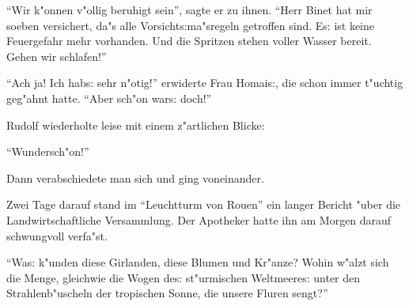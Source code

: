 \documentclass[oneside,12pt]{book}
\newcommand{\s}{s:}%
\begin{document}
"`Wir k"onnen v"ollig beruhigt sein"', sagte er zu ihnen. "`Herr
Binet hat mir soeben versichert, da"s alle Vorsicht{\s}ma"sregeln
getroffen sind. E{\s} ist keine Feuergefahr mehr vorhanden. Und
die Spritzen stehen voller Wasser bereit. Gehen wir schlafen!"'

"`Ach ja! Ich hab{\s} sehr n"otig!"' erwiderte Frau Homai{\s}, die
schon immer t"uchtig geg"ahnt hatte. "`Aber sch"on war{\s} doch!"'

Rudolf wiederholte leise mit einem z"artlichen Blicke:

"`Wundersch"on!"'

Dann verabschiedete man sich und ging voneinander.

Zwei Tage darauf stand im "`Leuchtturm von Rouen"' ein langer
Bericht "uber die Landwirtschaftliche Versammlung. Der Apotheker
hatte ihn am Morgen darauf schwungvoll verfa"st.

"`Wa{\s} k"unden diese Girlanden, diese Blumen und Kr"anze? Wohin
w"alzt sich die Menge, gleichwie die Wogen de{\s} st"urmischen
Weltmeere{\s} unter den Strahlenb"uscheln der tropischen Sonne,
die unsere Fluren sengt?"'
\end{document}
